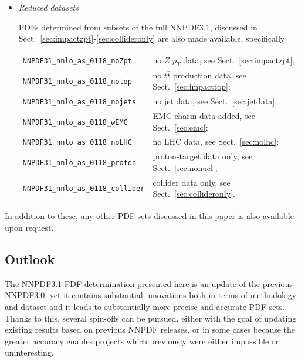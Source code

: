 \begin{itemize}
\item {\it Reduced datasets}

PDFs determined from subsets of the full NNPDF3.1, discussed in
  Sect.~\ref{sec:impactzpt}-\ref{sec:collideronly} are also made
  available, specifically
  \begin{flushleft}
  \begin{tabular}{ll}
  {\tt NNPDF31\_nnlo\_as\_0118\_noZpt} & no $Z$ $p_T$ data, see Sect.~\ref{sec:impactzpt}; \\
  {\tt NNPDF31\_nnlo\_as\_0118\_notop} & no $t\bar{t}$ production data, see Sect.~\ref{sec:impacttop}; \\
  {\tt NNPDF31\_nnlo\_as\_0118\_nojets} & no jet data,  see Sect.~\ref{sec:jetdata}; \\
  {\tt NNPDF31\_nnlo\_as\_0118\_wEMC} & EMC charm data added, see Sect.~\ref{sec:emc};\\
  {\tt NNPDF31\_nnlo\_as\_0118\_noLHC} & no LHC data,  see Sect.~\ref{sec:nolhc};  \\
  {\tt NNPDF31\_nnlo\_as\_0118\_proton}  &  proton-target data only, see Sect.~\ref{sec:nonucl};\\
  {\tt NNPDF31\_nnlo\_as\_0118\_collider} & collider data only, see Sect.~\ref{sec:collideronly}.\\
  \end{tabular}
  \end{flushleft}
\end{itemize}

 In addition to these, any  other PDF sets  discussed in this paper  is also available upon request.

\subsection{Outlook}
\label{sec:outlook}

The NNPDF3.1 PDF determination presented here is an update of the
previous NNPDF3.0, yet it contains substantial innovations both in
terms of methodology and dataset and it leads to  substantially more
precise and accurate PDF sets. Thanks to this, several spin-offs can
be pursued, either with the goal of updating existing results
based on previous NNPDF releases, or in some cases because the greater
accuracy enables projects which  previously were either impossible or
uninteresting.


